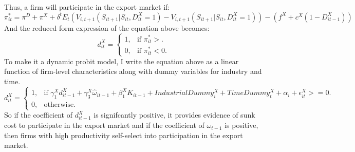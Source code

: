 \documentclass[11pt]{article}
\begin{document}
 Thus, a firm will participate in the export market if:
\begin{equation}
\pi_{it}^{*} = \pi^{D}+\pi^{X}  +
\delta^{t}E_{t}(V_{i,t+1}(S_{it+1}|S_{it},D_{it}^{X}=1) -
V_{i,t+1}(S_{it+1}|S_{it},D_{it}^{X}=1) ) -  (f^{X} + c^{X}(1-D_{it-1}^{X}))
\end{equation}
And the reduced form expression of the equation above becomes: 
\begin{equation}
  d_{it}^{X}=\begin{cases}
   1 , & \text{if $\pi_{it}^{*}>  $}.\\
   0 , & \text{if $\pi_{it}^{*}<  0$}.
  \end{cases}
\end{equation}
To make it a dynamic probit model, I write the equation above as a linear
function of firm-level characteristics along with dummy variables for
industry and time. 
\begin{equation}
  d_{it}^{X}=\begin{cases}
   1 , & \text{if $\gamma_{1}^{X} d_{it-1}^{X} + 
\gamma_{3}^{X} \hat{\omega}_{it-1}  + \beta_{1}^{X}K_{it-1}  +
IndustrialDummy_{i}^{X} + TimeDummy_{t}^{X}  + \alpha_{i}+ \epsilon_{it}^{X}>= 0   $}.\\
   0 , & \text{otherwise}.
  \end{cases}
\end{equation}
So if the coefficient of  $d_{it-1}^{X}$ is signifcantly positive, it provides
evidence of sunk cost to participate in the export market and if the
coefficient of $\omega_{t-1}$ is positive, then firms with high
productivity self-select into participation in the export market.
\end{document}
